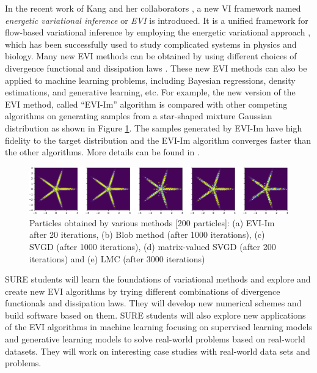 In the recent work of Kang and her collaborators \cite{wang2021particle}, a new VI framework named \emph{energetic variational inference} or \emph{EVI} is introduced. 
It is a unified framework for flow-based variational inference by employing the energetic variational approach \cite{liu2020variational},  which has been successfully used to study complicated systems in physics and biology.
Many new EVI methods can be obtained by using different choices of divergence functional \cite{amari2012differential} and dissipation laws \cite{liu2020variational}.
These new EVI methods can also be applied to machine learning problems, including Bayesian regressions, density estimations, and generative learning, etc. 
For example, the new version of the EVI method, called ``EVI-Im'' algorithm is compared with other competing algorithms on generating samples from a star-shaped mixture Gaussian distribution as shown in Figure \ref{fig:star}. 
The samples generated by EVI-Im have high fidelity to the target distribution and the EVI-Im algorithm converges faster than the other algorithms. More details can be found in \cite{wang2021particle}. 
\begin{figure}[thbp]
\centering
\includegraphics[width=\linewidth]{Star_compare}
\caption{ Particles obtained by various methods [200 particles]: (a) EVI-Im after 20 iterations, (b) Blob method (after 1000 iterations), (c) SVGD (after 1000 iterations), (d) matrix-valued SVGD (after 200 iterations) and (e) LMC (after 3000 iterations)}\label{fig:star}
\end{figure}

SURE students will learn the foundations of variational methods and explore  and create new EVI algorithms by trying different combinations of divergence functionals and dissipation laws. 
They will develop new numerical schemes and build software based on them. 
SURE students will also explore new applications of the EVI algorithms in machine learning focusing on supervised learning models and generative learning models to solve real-world problems based on real-world datasets. 
They will work on interesting case studies with real-world data sets and problems. 
